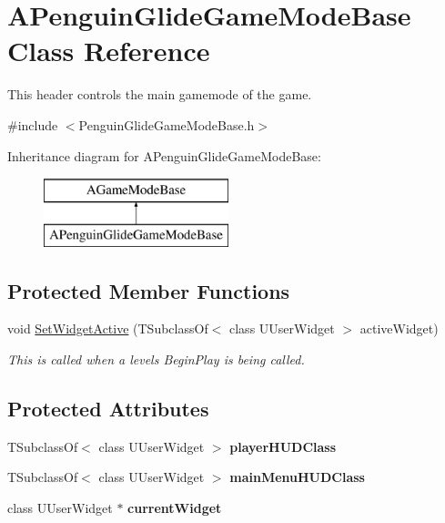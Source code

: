 \hypertarget{class_a_penguin_glide_game_mode_base}{}\section{A\+Penguin\+Glide\+Game\+Mode\+Base Class Reference}
\label{class_a_penguin_glide_game_mode_base}


This header controls the main gamemode of the game.  




{\ttfamily \#include $<$Penguin\+Glide\+Game\+Mode\+Base.\+h$>$}

Inheritance diagram for A\+Penguin\+Glide\+Game\+Mode\+Base\+:\begin{figure}[H]
\begin{center}
\leavevmode
\includegraphics[height=2.000000cm]{class_a_penguin_glide_game_mode_base}
\end{center}
\end{figure}
\subsection*{Protected Member Functions}
\begin{DoxyCompactItemize}
\item 
void \mbox{\hyperlink{class_a_penguin_glide_game_mode_base_ae81f88494076351c5d18b08a8854242f}{Set\+Widget\+Active}} (T\+Subclass\+Of$<$ class U\+User\+Widget $>$ active\+Widget)
\begin{DoxyCompactList}\small\item\em This is called when a level\textquotesingle{}s Begin\+Play is being called. \end{DoxyCompactList}\end{DoxyCompactItemize}
\subsection*{Protected Attributes}
\begin{DoxyCompactItemize}
\item 
\mbox{\label{class_a_penguin_glide_game_mode_base_ad1a642f5b944d76adb1658940dc8617c}} 
T\+Subclass\+Of$<$ class U\+User\+Widget $>$ {\bfseries player\+H\+U\+D\+Class}
\item 
\mbox{\label{class_a_penguin_glide_game_mode_base_a23ac27f19126405cc41c2bc02ef2f0e8}} 
T\+Subclass\+Of$<$ class U\+User\+Widget $>$ {\bfseries main\+Menu\+H\+U\+D\+Class}
\item 
\mbox{\label{class_a_penguin_glide_game_mode_base_a0b95180b6f41e7dd4f83b50ea3cffaa3}} 
class U\+User\+Widget $\ast$ {\bfseries current\+Widget}
\end{DoxyCompactItemize}


